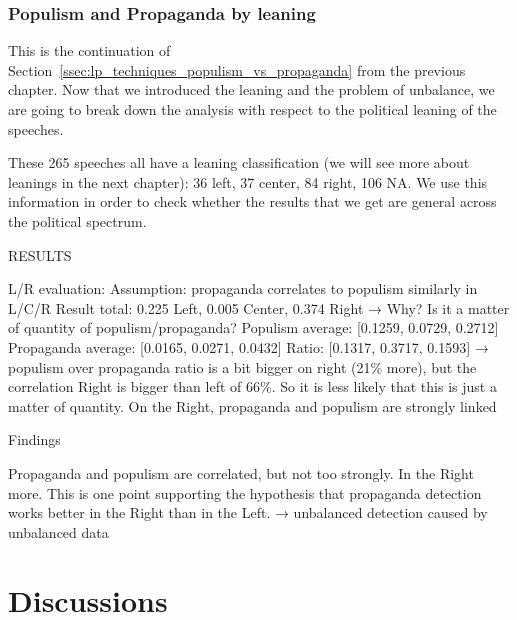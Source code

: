 

\subsubsection{Populism and Propaganda by leaning}

This is the continuation of Section~\ref{ssec:lp_techniques_populism_vs_propaganda} from the previous chapter. Now that we introduced the leaning and the problem of unbalance, we are going to break down the analysis with respect to the political leaning of the speeches.

These 265 speeches all have a leaning classification (we will see more about leanings in the next chapter): 36 left, 37 center, 84 right, 106 NA. We use this information in order to check whether the results that we get are general across the political spectrum.

RESULTS

L/R evaluation:
Assumption: propaganda correlates to populism similarly in L/C/R
Result total: 0.225 Left, 0.005 Center, 0.374 Right → Why? Is it a matter of quantity of populism/propaganda?
Populism average:  [0.1259, 0.0729, 0.2712]
Propaganda average: [0.0165, 0.0271, 0.0432]
Ratio: [0.1317, 0.3717, 0.1593] → populism over propaganda ratio is a bit bigger on right (21\% more), but the correlation Right is bigger than left of 66\%. So it is less likely that this is just a matter of quantity. On the Right, propaganda and populism are strongly linked

Findings

Propaganda and populism are correlated, but not too strongly. In the Right more. This is one point supporting the hypothesis that propaganda detection works better in the Right than in the Left. → unbalanced detection caused by unbalanced data


\section{Discussions}
\label{sec:ps_discussions}

